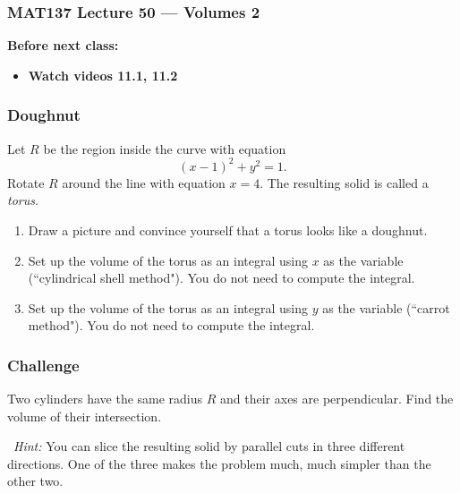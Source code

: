 \documentclass[14pt]{beamer}
\newcommand{\setsize}[1]{\fontsize{#1}{#1}\selectfont} %
\newcommand{\smallerfont}{\setsize{13}} %
\begin{document}
\begin{frame}
	\frametitle{MAT137 Lecture 50 --- Volumes 2}

	\vfill
	{\bf Before next class:}
		\begin{itemize} \normalsize
			\item {\bf Watch videos 11.1, 11.2}
		\end{itemize}
\end{frame}
	\begin{frame}[t]
		\smallerfont
		\frametitle{Doughnut}

		Let $R$ be the region inside the curve with equation
		\[
			(x-1)^{2} + y^{2}=1.
		\]
		Rotate $R$ around the line with equation ${\displaystyle x=4}$. The resulting
		solid is called a \emph{torus}.

		\begin{enumerate}
			\item Draw a picture and convince yourself that a torus looks like a doughnut.

			\item Set up the volume of the torus as an integral using $x$ as the variable
				(``cylindrical shell method"). You do not need to compute the integral.

			\item Set up the volume of the torus as an integral using $y$ as the variable
				(``carrot method"). You do not need to compute the integral.
		\end{enumerate}
	\end{frame}
	\begin{frame}[t]
		\frametitle{Challenge}

		Two cylinders have the same radius $R$ and their axes are perpendicular. Find
		the volume of their intersection.

		\
 \emph{Hint:} You can slice the resulting solid by parallel cuts in three
		different directions. One of the three makes the problem much, much simpler
		than the other two.
	\end{frame}


\end{document}
